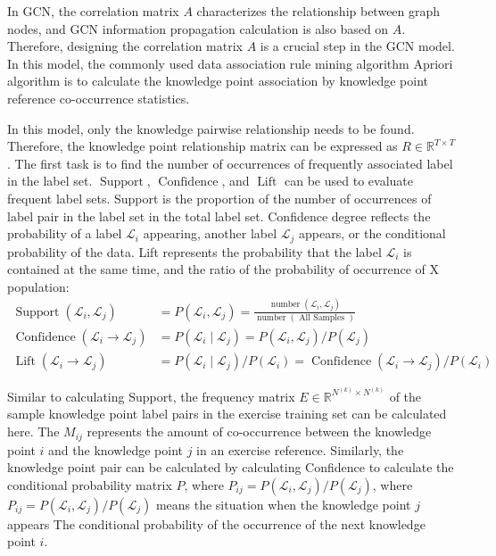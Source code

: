 In GCN, the correlation matrix \(A\) characterizes the relationship between graph nodes, and GCN information propagation calculation is also based on \(A\). Therefore, designing the correlation matrix \(A\) is a crucial step in the GCN model. In this model, the commonly used data association rule mining algorithm Apriori algorithm is to calculate the knowledge point association by knowledge point reference co-occurrence statistics.

In this model, only the knowledge pairwise relationship needs to be found. Therefore, the knowledge point relationship matrix can be expressed as \(R\in \mathbb{R}^{T\times T}\). The first task is to find the number of occurrences of frequently associated label in the label set. \(\operatorname{Support}\), \(\operatorname{Confidence}\), and \(\operatorname{Lift}\) can be used to evaluate frequent label sets. Support is the proportion of the number of occurrences of label pair in the label set in the total label set. Confidence degree reflects the probability of a label \(\mathcal{L}_i\) appearing, another label \(\mathcal{L}_j\) appears, or the conditional probability of the data. Lift represents the probability that the label \(\mathcal{L}_i\) is contained at the same time, and the ratio of the probability of occurrence of X population:
\begin{align}
	\operatorname{Support}(\mathcal{L}_i, \mathcal{L}_j)       & =P(\mathcal{L}_i,\mathcal{L}_j)=\frac{\operatorname{number}(\mathcal{L}_i,\mathcal{L}_j)}{\operatorname{number}(\text{ All Samples })} \\
	\operatorname{Confidence}(\mathcal{L}_i \to \mathcal{L}_j) & =P(\mathcal{L}_i \mid \mathcal{L}_j)=P(\mathcal{L}_i, \mathcal{L}_j) / P(\mathcal{L}_j)                                                \\
	\operatorname{Lift}(\mathcal{L}_i \to \mathcal{L}_j)       & =P(\mathcal{L}_i \mid \mathcal{L}_j) / P(\mathcal{L}_i)=\operatorname{Confidence}(\mathcal{L}_i \to \mathcal{L}_j) / P(\mathcal{L}_i)
\end{align}

Similar to calculating Support, the frequency matrix \(E\in \mathbb{R}^{N^{(k)}\times N^{(k)}}\) of the sample knowledge point label pairs in the exercise training set can be calculated here. The \(M_{ij}\) represents the amount of co-occurrence between the knowledge point \(i\) and the knowledge point \(j\) in an exercise reference. Similarly, the knowledge point pair can be calculated by calculating Confidence to calculate the conditional probability matrix \(P\), where \(P_{ij}=P(\mathcal{L}_i, \mathcal{L}_j)/P(\mathcal{L}_j)\), where \(P_{ij}=P(\mathcal{L}_i, \mathcal{L}_j)/P(\mathcal{L}_j)\) means the situation when the knowledge point \(j\) appears The conditional probability of the occurrence of the next knowledge point \(i\).

